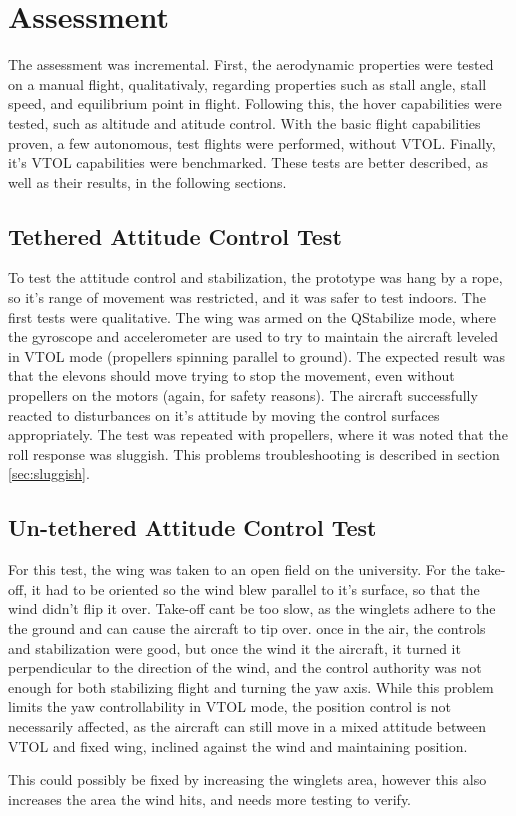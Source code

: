 \chapter{Assessment} \label{chap:assessment}

The assessment was incremental. First, the aerodynamic properties were tested on a manual flight, qualitativaly, regarding properties such as stall angle, stall speed, and equilibrium point in flight. Following this, the hover capabilities were tested, such as altitude and atitude control. With the basic flight capabilities proven, a few autonomous, test flights were performed, without VTOL. Finally, it's VTOL capabilities were benchmarked. These tests are better described, as well as their results, in the following sections.


\section{Tethered Attitude Control Test}

To test the attitude control and stabilization, the prototype was hang by a rope, so it's range of movement was restricted, and it was safer to test indoors.
%
The first tests were qualitative. The wing was armed on the QStabilize mode, where the gyroscope and accelerometer are used to try to maintain the aircraft leveled in VTOL mode (propellers spinning parallel to ground).
%
The expected result was that the elevons should move trying to stop the movement, even without propellers on the motors (again, for safety reasons).
%
The aircraft successfully reacted to disturbances on it's attitude by moving the control surfaces appropriately.
%
The test was repeated with propellers, where it was noted that the roll response was sluggish. This problems troubleshooting is described in section \ref{sec:sluggish}.

\section{Un-tethered Attitude Control Test} 

For this test, the wing was taken to an open field on the university.
%
For the take-off, it had to be oriented so the wind blew parallel to it's surface, so that the wind didn't flip it over.
%
Take-off cant be too slow, as the winglets adhere to the the ground and can cause the aircraft to tip over.
%
once in the air, the controls and stabilization were good, but once the wind it the aircraft, it turned it perpendicular to the direction of the wind, and the control authority was not enough for both stabilizing flight and turning the yaw axis.
%
While this problem limits the yaw controllability in VTOL mode, the position control is not necessarily affected, as the aircraft can still move in a mixed attitude between VTOL and fixed wing, inclined against the wind and maintaining position.
%

This could possibly be fixed by increasing the winglets area, however this also increases the area the wind hits, and needs more testing to verify.
%







